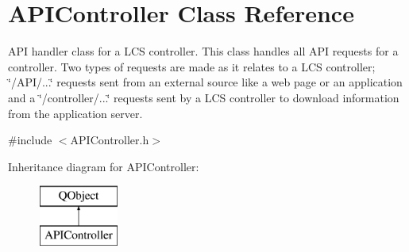 \hypertarget{class_a_p_i_controller}{}\section{A\+P\+I\+Controller Class Reference}
\label{class_a_p_i_controller}


A\+PI handler class for a L\+CS controller. This class handles all A\+PI requests for a controller. Two types of requests are made as it relates to a L\+CS controller; \char`\"{}/\+A\+P\+I/...\char`\"{} requests sent from an external source like a web page or an application and a \char`\"{}/controller/...\char`\"{} requests sent by a L\+CS controller to download information from the application server.  




{\ttfamily \#include $<$A\+P\+I\+Controller.\+h$>$}

Inheritance diagram for A\+P\+I\+Controller\+:\begin{figure}[H]
\begin{center}
\leavevmode
\includegraphics[height=2.000000cm]{class_a_p_i_controller}
\end{center}
\end{figure}
